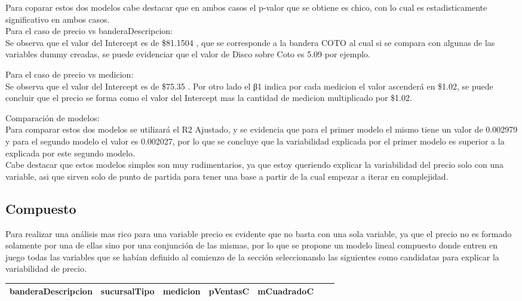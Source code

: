 Para coparar estos dos modelos cabe destacar que en ambos casos el p-valor que se obtiene es chico, con lo cual es estadisticamente significativo en ambos casos.\\

Para el caso de precio vs banderaDescripcion:\\

Se observa que el valor del Intercept es de \$81.1504 , que se corresponde a la bandera COTO al cual si se compara con algunas de las variables dummy creadas, se puede evidenciar que el valor de Disco sobre Coto es 5.09 por ejemplo.


Para el caso de precio vs medicion:\\

Se observa que el valor del Intercept es de \$75.35 . 
Por otro lado el β1 indica por cada medicion el valor ascenderá en \$1.02, se puede concluir que el precio se forma como el valor del Intercept mas la cantidad de medicion multiplicado por \$1.02.


Comparación de modelos:\\
Para comparar estos dos modelos se utilizará el R2 Ajustado, y se evidencia que para el primer modelo el mismo tiene un valor de 0.002979 y para el segundo modelo el valor es 0.002027, por lo que se concluye que la variabilidad explicada por el primer modelo es superior a la explicada por este segundo modelo.\\
Cabe destacar que estos modelos simples son muy rudimentarios, ya que estoy queriendo explicar la variabilidad del precio solo con una variable, asi que sirven solo de punto de partida para tener una base a partir de la cual empezar a iterar en complejidad.




\subsection{Compuesto}

Para realizar una análisis mas rico para una variable precio es evidente que no basta con una sola variable, ya que el precio no es formado solamente por una de ellas sino por una conjunción de las mismas, por lo que se propone un modelo lineal compuesto donde entren en juego todas las variables que se habían definido al comienzo de la sección seleccionando las siguientes como candidatas para explicar la variabilidad de precio.\\


\begin{center}
 \begin{tabular}{||c c c c c c c||} 
 \hline
    banderaDescripcion & sucursalTipo & medicion & pVentasC & mCuadradoC \\ 
 \hline
 \hline
\end{tabular}
\end{center}


